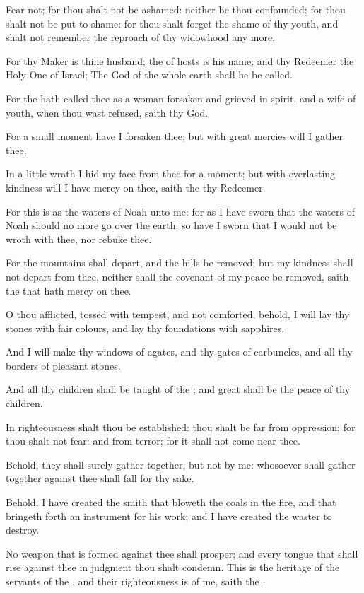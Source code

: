 \Verse Fear not; for thou shalt not be ashamed: neither be thou confounded; for thou shalt not be put to shame: for thou shalt forget the shame of thy youth, and shalt not remember the reproach of thy widowhood any more.

\Verse For thy Maker is thine husband; the \LORD of hosts is his name; and thy Redeemer the Holy One of Israel; The God of the whole earth shall he be called.

\Verse For the \LORD hath called thee as a woman forsaken and grieved in spirit, and a wife of youth, when thou wast refused, saith thy God.

\Verse For a small moment have I forsaken thee; but with great mercies will I gather thee.

\Verse In a little wrath I hid my face from thee for a moment; but with everlasting kindness will I have mercy on thee, saith the \LORD thy Redeemer.

\Verse For this is as the waters of Noah unto me: for as I have sworn that the waters of Noah should no more go over the earth; so have I sworn that I would not be wroth with thee, nor rebuke thee.

\Verse For the mountains shall depart, and the hills be removed; but my kindness shall not depart from thee, neither shall the covenant of my peace be removed, saith the \LORD that hath mercy on thee.

\Verse O thou afflicted, tossed with tempest, and not comforted, behold, I will lay thy stones with fair colours, and lay thy foundations with sapphires.

\Verse And I will make thy windows of agates, and thy gates of carbuncles, and all thy borders of pleasant stones.

\Verse And all thy children shall be taught of the \LORD; and great shall be the peace of thy children.

\Verse In righteousness shalt thou be established: thou shalt be far from oppression; for thou shalt not fear: and from terror; for it shall not come near thee.

\Verse Behold, they shall surely gather together, but not by me: whosoever shall gather together against thee shall fall for thy sake.

\Verse Behold, I have created the smith that bloweth the coals in the fire, and that bringeth forth an instrument for his work; and I have created the waster to destroy.

\Verse No weapon that is formed against thee shall prosper; and every tongue that shall rise against thee in judgment thou shalt condemn.  This is the heritage of the servants of the \LORD, and their righteousness is of me, saith the \LORD.


